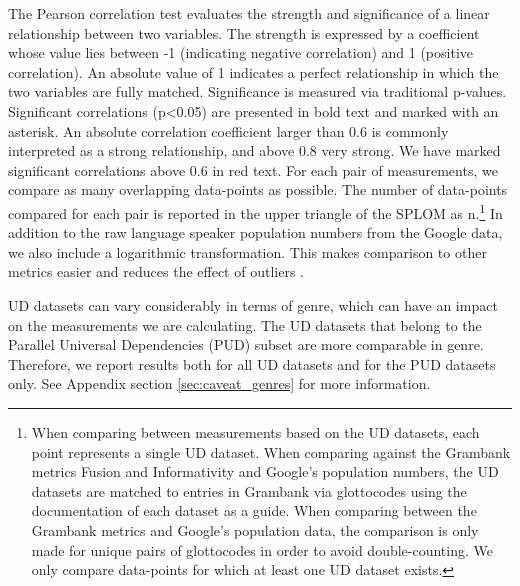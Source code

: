 \documentclass[USenglish]{article}
\begin{document}
The Pearson correlation test evaluates the strength and significance of a linear relationship between two variables. 
The strength is expressed by a coefficient whose value lies between -1 (indicating negative correlation) and 1 (positive correlation). 
An absolute value of 1 indicates a perfect relationship in which the two variables are fully matched. 
Significance is measured via traditional p-values.
Significant correlations (p<0.05) are presented in bold text and marked with an asterisk. 
An absolute correlation coefficient larger than 0.6 is commonly interpreted as a strong relationship, and above 0.8 very strong. 
We have marked significant correlations above 0.6 in red text.
For each pair of measurements, we compare as many overlapping data-points as possible.
The number of data-points compared for each pair is reported in the upper triangle of the SPLOM as n.\footnote{When comparing between measurements based on the UD datasets, each point represents a single UD dataset. When comparing against the Grambank metrics Fusion and Informativity and Google's population numbers, the UD datasets are matched to entries in Grambank via glottocodes \citep{glottolog5.0} using the documentation of each dataset as a guide. When comparing between the Grambank metrics and Google's population data, the comparison is only made for unique pairs of glottocodes in order to avoid double-counting. We only compare data-points for which at least one UD dataset exists.}
In addition to the raw language speaker population numbers from the Google data, we also include a logarithmic transformation.
This makes comparison to other metrics easier and reduces the effect of outliers \citep{changyong2014log}.

UD datasets can vary considerably in terms of genre, which can have an impact on the measurements we are calculating. 
The UD datasets that belong to the Parallel Universal Dependencies (PUD) subset are more comparable in genre. 
Therefore, we report results both for all UD datasets and for the PUD datasets only. 
See Appendix section \ref{sec:caveat_genres} for more information.
\end{document}
